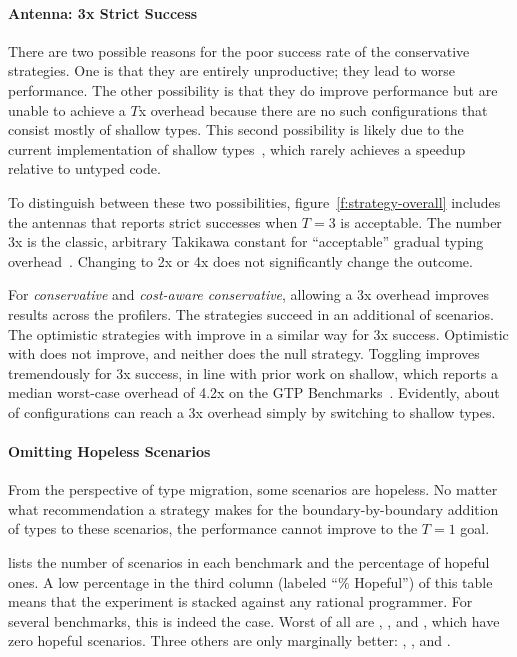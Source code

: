\paragraph{Antenna: 3x Strict Success} \label{s:antenna}

There are two possible reasons for the poor success rate of the conservative
strategies.
One is that they are entirely unproductive; they lead to worse performance.
The other possibility is that they do improve performance but are unable
to achieve a $T$x overhead because there are no such configurations that
consist mostly of shallow types.
This second possibility is likely due to the current implementation of shallow
types~\cite{g-deep-shallow}, which rarely achieves a speedup relative to untyped
code.

To distinguish between these two possibilities,
figure~\ref{f:strategy-overall} includes the antennas that
reports strict successes when $T = 3$ is acceptable.  The
number 3x is the classic, arbitrary Takikawa constant for ``acceptable'' gradual typing
overhead~\cite{vss-popl-2017,bbst-oopsla-2017}.  Changing to 2x or 4x does not
significantly change the outcome.

For \emph{conservative} and \emph{cost-aware conservative}, allowing a 3x
overhead improves results across the profilers. The strategies succeed in an
additional  of scenarios.  The optimistic strategies with \statkw{}
improve in a similar way for 3x success.  Optimistic with \featkw{} does
not improve, and neither does the null strategy.  Toggling
improves tremendously for 3x success, in line with prior work on shallow, which
reports a median worst-case overhead of 4.2x on the GTP
Benchmarks~\cite{g-deep-shallow}.  Evidently, about  of configurations can
reach a 3x overhead simply by switching to shallow types.

\paragraph{Omitting Hopeless Scenarios} From the perspective of type
migration, some scenarios are hopeless. No matter what recommendation a strategy
makes for the boundary-by-boundary addition of types to these scenarios,
the performance cannot improve to the $T=1$ goal.

 lists the number of scenarios in each benchmark and the
percentage of hopeful ones. A low percentage in the third column (labeled ``\%
Hopeful'') of this table means that the experiment is stacked against any rational
programmer.  For several benchmarks, this is indeed the case.  Worst of all are
, , and , which have zero hopeful
scenarios.  Three others are only marginally better: ,
, and .

